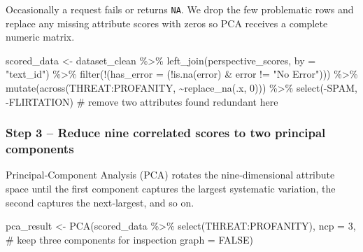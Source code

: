 \documentclass[
  letterpaper,
  DIV=11,
  numbers=noendperiod]{scrartcl}
\newenvironment{Shaded}{\begin{snugshade}}{\end{snugshade}}
\newcommand{\AttributeTok}[1]{\textcolor[rgb]{0.40,0.45,0.13}{#1}}
\newcommand{\CommentTok}[1]{\textcolor[rgb]{0.37,0.37,0.37}{#1}}
\newcommand{\ConstantTok}[1]{\textcolor[rgb]{0.56,0.35,0.01}{#1}}
\newcommand{\DecValTok}[1]{\textcolor[rgb]{0.68,0.00,0.00}{#1}}
\newcommand{\FunctionTok}[1]{\textcolor[rgb]{0.28,0.35,0.67}{#1}}
\newcommand{\NormalTok}[1]{\textcolor[rgb]{0.00,0.23,0.31}{#1}}
\newcommand{\OtherTok}[1]{\textcolor[rgb]{0.00,0.23,0.31}{#1}}
\newcommand{\SpecialCharTok}[1]{\textcolor[rgb]{0.37,0.37,0.37}{#1}}
\newcommand{\StringTok}[1]{\textcolor[rgb]{0.13,0.47,0.30}{#1}}
\begin{document}
\begin{tcolorbox}
Occasionally a request fails or returns \texttt{NA}. We drop the few
problematic rows and replace any missing attribute scores with zeros so
PCA receives a complete numeric matrix.

\begin{Shaded}
\begin{Highlighting}[]
\NormalTok{scored\_data }\OtherTok{\textless{}{-}}\NormalTok{ dataset\_clean }\SpecialCharTok{\%\textgreater{}\%}
  \FunctionTok{left\_join}\NormalTok{(perspective\_scores, }\AttributeTok{by =} \StringTok{"text\_id"}\NormalTok{) }\SpecialCharTok{\%\textgreater{}\%}
  \FunctionTok{filter}\NormalTok{(}\SpecialCharTok{!}\NormalTok{(}\AttributeTok{has\_error =}\NormalTok{ (}\SpecialCharTok{!}\FunctionTok{is.na}\NormalTok{(error) }\SpecialCharTok{\&}\NormalTok{ error }\SpecialCharTok{!=} \StringTok{"No Error"}\NormalTok{))) }\SpecialCharTok{\%\textgreater{}\%}
  \FunctionTok{mutate}\NormalTok{(}\FunctionTok{across}\NormalTok{(THREAT}\SpecialCharTok{:}\NormalTok{PROFANITY, }\SpecialCharTok{\textasciitilde{}}\FunctionTok{replace\_na}\NormalTok{(.x, }\DecValTok{0}\NormalTok{))) }\SpecialCharTok{\%\textgreater{}\%}
  \FunctionTok{select}\NormalTok{(}\SpecialCharTok{{-}}\NormalTok{SPAM, }\SpecialCharTok{{-}}\NormalTok{FLIRTATION)   }\CommentTok{\# remove two attributes found redundant here}
\end{Highlighting}
\end{Shaded}

\subsubsection{Step 3 -- Reduce nine correlated scores to two principal
components}\label{step-3-reduce-nine-correlated-scores-to-two-principal-components}

Principal‑Component Analysis (PCA) rotates the nine‑dimensional
attribute space until the first component captures the largest
systematic variation, the second captures the next‑largest, and so on.

\begin{Shaded}
\begin{Highlighting}[]
\NormalTok{pca\_result }\OtherTok{\textless{}{-}} \FunctionTok{PCA}\NormalTok{(scored\_data }\SpecialCharTok{\%\textgreater{}\%} \FunctionTok{select}\NormalTok{(THREAT}\SpecialCharTok{:}\NormalTok{PROFANITY),}
                  \AttributeTok{ncp   =} \DecValTok{3}\NormalTok{,    }\CommentTok{\# keep three components for inspection}
                  \AttributeTok{graph =} \ConstantTok{FALSE}\NormalTok{)}


\end{Highlighting}
\end{Shaded}
\end{tcolorbox}
\end{document}
